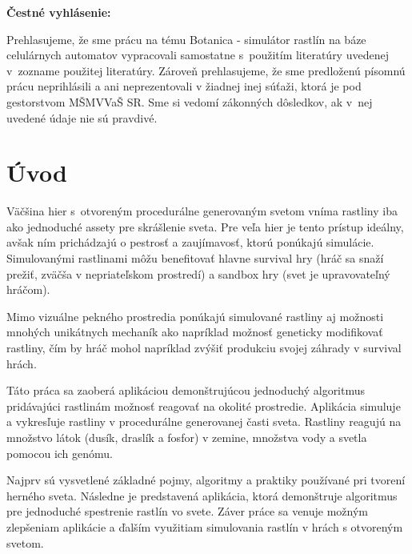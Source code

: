 \documentclass[12pt]{article}
\def\nazovprace{Botanica - simulátor rastlín na báze celulárnych automatov}
\begin{document}
\setcounter{page}{3}


\thispagestyle{empty}

\null
\vspace{4cm}

\noindent
\textbf{Čestné vyhlásenie:}

\noindent
Prehlasujeme, že sme prácu na tému
\nazovprace \space
vypracovali samostatne s~použitím literatúry uvedenej v~zozname použitej literatúry.
Zároveň prehlasujeme, že sme predloženú písomnú prácu neprihlásili a ani neprezentovali
v žiadnej inej súťaži, ktorá je pod gestorstvom MŠMVVaŠ SR. Sme si vedomí zákonných dôsledkov,
ak v~nej uvedené údaje nie sú pravdivé.

\newpage


%
%

% 
% 
% 
% 


\thispagestyle{empty}
\tableofcontents

%
%

\section*{Úvod}

Väčšina hier s~otvoreným procedurálne generovaným svetom vníma rastliny iba ako
jednoduché assety pre skrášlenie sveta. Pre veľa hier je tento prístup ideálny,
avšak ním prichádzajú o pestrosť a zaujímavosť, ktorú ponúkajú simulácie.
Simulovanými rastlinami môžu benefitovať hlavne survival hry (hráč sa snaží
prežiť, zväčša v nepriateľskom prostredí) a sandbox hry (svet je upravovateľný
hráčom).

Mimo vizuálne pekného prostredia ponúkajú simulované rastliny aj možnosti
mnohých unikátnych mechaník ako napríklad možnosť geneticky
modifikovať rastliny, čím by hráč mohol napríklad zvýšiť produkciu svojej záhrady
v survival hrách.

Táto práca sa zaoberá aplikáciou demonštrujúcou jednoduchý algoritmus
pridávajúci rastlinám možnosť reagovať na okolité prostredie. Aplikácia
simuluje a vykresľuje rastliny v procedurálne generovanej časti sveta.
Rastliny reagujú na množstvo látok (dusík, draslík a fosfor) v zemine,
množstva vody a svetla pomocou ich genómu.

Najprv sú vysvetlené základné pojmy, algoritmy a praktiky používané pri tvorení
herného sveta. Následne je predstavená aplikácia, ktorá demonštruje algoritmus
pre jednoduché spestrenie rastlín vo svete. Záver práce sa venuje možným
zlepšeniam aplikácie a ďalším využitiam simulovania rastlín v hrách
s otvoreným svetom.
\end{document}
